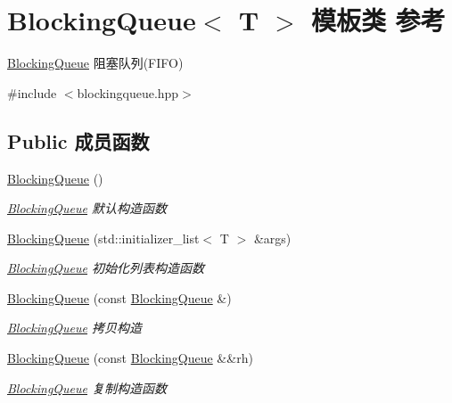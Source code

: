 \hypertarget{classBlockingQueue}{}\section{Blocking\+Queue$<$ T $>$ 模板类 参考}
\label{classBlockingQueue}


\hyperlink{classBlockingQueue}{Blocking\+Queue} 阻塞队列(\+F\+I\+F\+O)  




{\ttfamily \#include $<$blockingqueue.\+hpp$>$}

\subsection*{Public 成员函数}
\begin{DoxyCompactItemize}
\item 
\mbox{\label{classBlockingQueue_a42f821a61ba22ba27e6d1a434ab27eb2}} 
\hyperlink{classBlockingQueue_a42f821a61ba22ba27e6d1a434ab27eb2}{Blocking\+Queue} ()
\begin{DoxyCompactList}\small\item\em \hyperlink{classBlockingQueue}{Blocking\+Queue} 默认构造函数 \end{DoxyCompactList}\item 
\hyperlink{classBlockingQueue_a265931efcceccd5c99ac76178507559b}{Blocking\+Queue} (std\+::initializer\+\_\+list$<$ T $>$ \&args)
\begin{DoxyCompactList}\small\item\em \hyperlink{classBlockingQueue}{Blocking\+Queue} 初始化列表构造函数 \end{DoxyCompactList}\item 
\hyperlink{classBlockingQueue_a2f2b1e4d887d77a81fddabd44c5cdbfd}{Blocking\+Queue} (const \hyperlink{classBlockingQueue}{Blocking\+Queue} \&)
\begin{DoxyCompactList}\small\item\em \hyperlink{classBlockingQueue}{Blocking\+Queue} 拷贝构造 \end{DoxyCompactList}\item 
\hyperlink{classBlockingQueue_a0d375ec5bec4f19887d0a4757d95e087}{Blocking\+Queue} (const \hyperlink{classBlockingQueue}{Blocking\+Queue} \&\&rh)
\begin{DoxyCompactList}\small\item\em \hyperlink{classBlockingQueue}{Blocking\+Queue} 复制构造函数 \end{DoxyCompactList}\item 

\end{DoxyCompactItemize}
